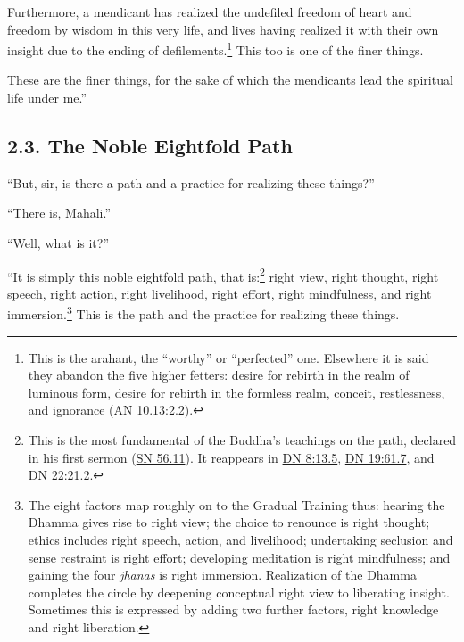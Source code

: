 \documentclass[12pt,openany]{book}%
\begin{document}
Furthermore, a mendicant has realized the undefiled freedom of heart and freedom by wisdom in this very life, and lives having realized it with their own insight due to the ending of defilements.\footnote{This is the arahant, the “worthy” or “perfected” one. Elsewhere it is said they abandon the five higher fetters: desire for rebirth in the realm of luminous form, desire for rebirth in the formless realm, conceit, restlessness, and ignorance (\href{https://suttacentral.net/an10.13/en/sujato\#2.2}{AN 10.13:2.2}). } This too is one of the finer things. 

These are the finer things, for the sake of which the mendicants lead the spiritual life under me.” 

\subsection*{2.3. The Noble Eightfold Path }

“But, sir, is there a path and a practice for realizing these things?” 

“There is, \textsanskrit{Mahāli}.” 

“Well, what is it?” 

“It is simply this noble eightfold path, that is:\footnote{This is the most fundamental of the Buddha’s teachings on the path, declared in his first sermon (\href{https://suttacentral.net/sn56.11/en/sujato}{SN 56.11}). It reappears in \href{https://suttacentral.net/dn8/en/sujato\#13.5}{DN 8:13.5}, \href{https://suttacentral.net/dn19/en/sujato\#61.7}{DN 19:61.7}, and \href{https://suttacentral.net/dn22/en/sujato\#21.2}{DN 22:21.2}. } right view, right thought, right speech, right action, right livelihood, right effort, right mindfulness, and right immersion.\footnote{The eight factors map roughly on to the Gradual Training thus: hearing the Dhamma gives rise to right view; the choice to renounce is right thought; ethics includes right speech, action, and livelihood; undertaking seclusion and sense restraint is right effort; developing meditation is right mindfulness; and gaining the four \textit{\textsanskrit{jhānas}} is right immersion. Realization of the Dhamma completes the circle by deepening conceptual right view to liberating insight. Sometimes this is expressed by adding two further factors, right knowledge and right liberation. } This is the path and the practice for realizing these things. 
\end{document}
